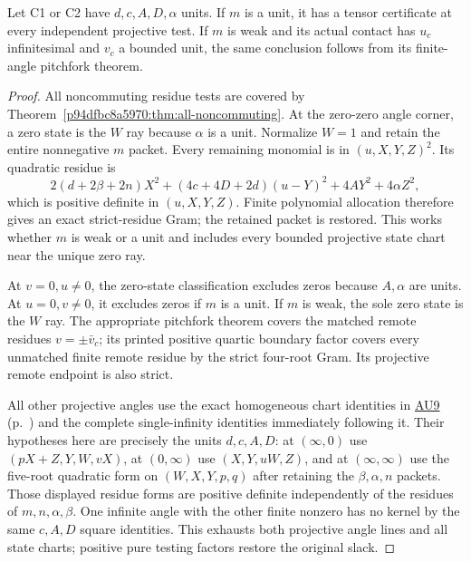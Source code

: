 \begin{lemma}
\label{pfb270019c56f:lem:positive-d-strong-dispatch}
Let C1 or C2 have $d,c,A,D,\alpha$ units. If $m$ is a unit, it has
a tensor certificate at every independent projective test. If $m$
is weak and its actual contact has $u_c$ infinitesimal and $v_c$
a bounded unit, the same conclusion follows from its finite-angle
pitchfork theorem.
\end{lemma}
\begin{proof}
All noncommuting residue tests are covered by
Theorem~\ref{p94dfbc8a5970:thm:all-noncommuting}. At the zero-zero angle corner,
a zero state is the $W$ ray because $\alpha$ is a unit. Normalize
$W=1$ and retain the entire nonnegative $m$ packet. Every remaining
monomial is in $(u,X,Y,Z)^2$. Its quadratic residue is
\[
 2(d+2\beta+2n)X^2+(4c+4D+2d)(u-Y)^2+4AY^2+4\alpha Z^2,
\]
which is positive definite in $(u,X,Y,Z)$. Finite polynomial
allocation therefore gives an exact strict-residue Gram; the
retained packet is restored. This works whether $m$ is weak or a
unit and includes every bounded projective state chart near the
unique zero ray.

At $v=0,u\ne0$, the zero-state classification excludes zeros because
$A,\alpha$ are units. At $u=0,v\ne0$, it excludes zeros if $m$ is
a unit. If $m$ is weak, the sole zero state is the $W$ ray. The
appropriate pitchfork theorem covers the matched remote residues
$v=\pm\bar v_c$; its printed positive quartic boundary factor
covers every unmatched finite remote residue by the strict
four-root Gram. Its projective remote endpoint is also strict.

All other projective angles use the exact homogeneous chart
identities in \hyperref[component:pc0b2849f8d09]{AU9} (p.~\pageref{component:pc0b2849f8d09}) and the complete single-infinity identities immediately following it.
Their hypotheses here are precisely the units $d,c,A,D$: at
$(\infty,0)$ use $(pX+Z,Y,W,vX)$, at $(0,\infty)$ use
$(X,Y,uW,Z)$, and at $(\infty,\infty)$ use the five-root
quadratic form on $(W,X,Y,p,q)$ after retaining the $\beta,\alpha,n$
packets.
Those displayed residue forms are positive definite independently
of the residues of $m,n,\alpha,\beta$. One infinite angle with the
other finite nonzero has no kernel by the same $c,A,D$ square
identities. This exhausts both projective angle lines and all state
charts; positive pure testing factors restore the original slack.
\end{proof}

